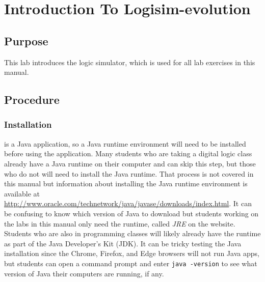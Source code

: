 \chapter{Introduction To Logisim-evolution}\label{intro}



\section{Purpose}

This lab introduces the \LE logic simulator, which is used for all lab exercises in this manual. 


\section{Procedure}

\subsection{Installation}

\LE is a Java application, so a Java runtime environment will need to be installed before using the application. Many students who are taking a digital logic class already have a Java runtime on their computer and can skip this step, but those who do not will need to install the Java runtime. That process is not covered in this manual but information about installing the Java runtime environment is available at \url{http://www.oracle.com/technetwork/java/javase/downloads/index.html}. It can be confusing to know which version of Java to download but students working on the labs in this manual only need the runtime, called \textit{JRE} on the website. Students who are also in programming classes will likely already have the runtime as part of the Java Developer's Kit (JDK). It can be tricky testing the Java installation since the Chrome, Firefox, and Edge browsers will not run Java apps, but students can open a command prompt and enter \lstinline|java -version| to see what version of Java their computers are running, if any.

